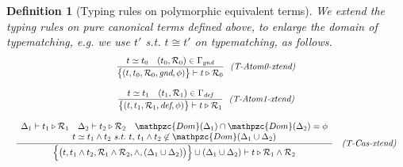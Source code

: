 \documentclass[12pt]{article}
\newtheorem{Definition}{Definition}[section]
\begin{document}
\pagebreak
\begin{Definition}[Typing rules on polymorphic equivalent terms]
  We extend the typing rules on pure canonical terms defined above, to
  enlarge the domain of typematching, e.g. we use $t'$ s.t. $t \cong t'$ on
  typematching, as follows.
  \begin{displaymath}
    \begin{array}{c}

      \begin{array}{rl}
        \dfrac{
          t \simeq t_0
           \quad (t_0, \mathcal{R}_0) \in \Gamma_\text{\it gnd}
        }{
          \bigl\{(t, t_0, \mathcal{R}_0, \text{\it gnd}, \phi ) \bigr\}
           \vdash t \triangleright \mathcal{R}_0
        }  &  \!\!\text{\it (T-Atom0-xtend)}
      \end{array}  \\
      \\

      \begin{array}{rl}
        \dfrac{
          t \simeq t_1
           \quad (t_1, \mathcal{R}_1) \in \Gamma_\text{\it def}
        }{
          \bigl\{(t, t_1, \mathcal{R}_1, \text{\it def}, \phi ) \bigr\}
           \vdash t \triangleright \mathcal{R}_1
        }  &  \!\!\text{\it (T-Atom1-xtend)}
      \end{array}  \\
      \\
      
      \begin{array}{rl}
        \dfrac{
          \begin{array}{c}
            \Delta_1 \vdash t_1 \triangleright \mathcal{R}_1
             \quad \Delta_2 \vdash t_2 \triangleright \mathcal{R}_2
              \quad \mathpzc{Dom}(\Delta_1) \cap \mathpzc{Dom}(\Delta_2)
               = \phi  \\
            t \simeq t_1 \wedge t_2\
             \text{\it s.t.}\ t,\, t_1 \wedge t_2 \not\in \mathpzc{Dom}(
              \Delta_1 \cup \Delta_2)
          \end{array}
        }{
          \Bigl\{\bigl(t, t_1 \wedge t_2,
           \mathcal{R}_1 \wedge \mathcal{R}_2, \wedge,
            (\Delta_1 \cup \Delta_2) \bigr) \Bigr\}
             \cup (\Delta_1 \cup \Delta_2) \vdash
              t \triangleright \mathcal{R}_1 \wedge \mathcal{R}_2
        }  &  \text{\it (T-Cas-xtend)}
      \end{array}  \\
      \\
      

\end{array}
\end{displaymath}
\end{Definition}
\end{document}
